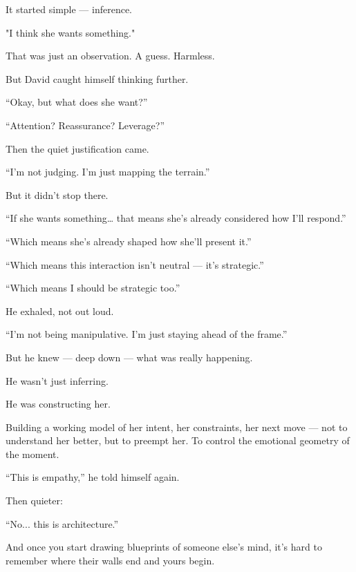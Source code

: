 \medskip


It started simple — inference.

"I think she wants something."

That was just an observation. A guess. Harmless.

But David caught himself thinking further.

“Okay, but what does she want?”

“Attention? Reassurance? Leverage?”

Then the quiet justification came.

“I’m not judging. I’m just mapping the terrain.”

But it didn’t stop there.

“If she wants something… that means she’s already considered how I’ll respond.”

“Which means she’s already shaped how she’ll present it.”

“Which means this interaction isn’t neutral — it’s strategic.”

“Which means I should be strategic too.”

He exhaled, not out loud.

“I’m not being manipulative. I’m just staying ahead of the frame.”

But he knew — deep down — what was really happening.

He wasn’t just inferring.

He was constructing her.

Building a working model of her intent, her constraints, her next move — not to understand her better, but to preempt her. To control the emotional geometry of the moment.

“This is empathy,” he told himself again.

Then quieter:

“No... this is architecture.”

And once you start drawing blueprints of someone else’s mind, it’s hard to remember where their walls end and yours begin.

\medskip

